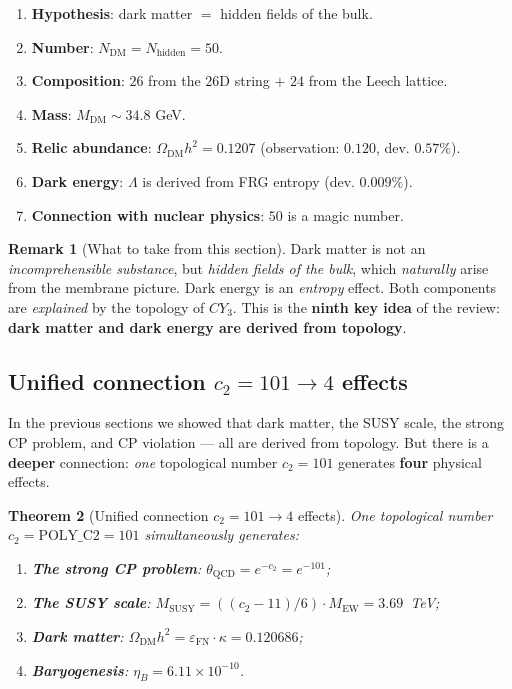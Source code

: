 \documentclass[11pt,a4paper]{article}
\newcommand{\CY}{CY_3}
\newcommand{\Nhidden}{N_{\text{hidden}}}
\newcommand{\epsFN}{\varepsilon_{\text{FN}}}
\newtheorem{theorem}{Theorem}[section]
\theoremstyle{definition}
\newtheorem{remark}[theorem]{Remark}
\begin{document}
\begin{enumerate}
    \item \textbf{Hypothesis}: dark matter $=$ hidden fields of the bulk.
    \item \textbf{Number}: $N_{\text{DM}} = \Nhidden = 50$.
    \item \textbf{Composition}: $26$ from the $26$D string $+$ $24$ from 
          the Leech lattice.
    \item \textbf{Mass}: $M_{\text{DM}} \sim 34.8$ GeV.
    \item \textbf{Relic abundance}: 
          $\Omega_{\text{DM}} h^2 = 0.1207$ (observation: $0.120$, 
          dev. $0.57\%$).
    \item \textbf{Dark energy}: $\Lambda$ is derived from 
          FRG entropy (dev. $0.009\%$).
    \item \textbf{Connection with nuclear physics}: $50$ is a magic 
          number.
\end{enumerate}

\begin{remark}[What to take from this section]
\label{rem:dm-takeaway}
Dark matter is not an \emph{incomprehensible substance}, but 
\emph{hidden fields of the bulk}, which \emph{naturally} 
arise from the membrane picture. Dark energy is an 
\emph{entropy} effect. Both components are \emph{explained} 
by the topology of $\CY$. This is the \textbf{ninth key idea} 
of the review: \textbf{dark matter and dark energy are derived 
from topology}.
\end{remark}

\subsection{Unified connection \texorpdfstring{$c_2 = 101 \to 4$}{c2 = 101 -> 4} effects}
\label{subsec:unified-c2-review}

In the previous sections we showed that dark matter, 
the SUSY scale, the strong CP problem, and CP violation — all 
are derived from topology. But there is a \textbf{deeper} 
connection: \emph{one} topological number $c_2 = 101$ generates 
\textbf{four} physical effects.

\begin{theorem}[Unified connection $c_2 = 101 \to 4$ effects]
\label{thm:unified-c2-review}
One topological number $c_2 = \text{POLY\_C2} = 101$ 
simultaneously generates:
\begin{enumerate}
    \item \textbf{The strong CP problem}: 
          $\theta_{\text{QCD}} = e^{-c_2} = e^{-101}$;
    \item \textbf{The SUSY scale}: 
          $M_{\text{SUSY}} = ((c_2-11)/6) \cdot M_{\text{EW}} = 3.69$~TeV;
    \item \textbf{Dark matter}: 
          $\Omega_{\text{DM}} h^2 = \epsFN \cdot \kappa = 0.120686$;
    \item \textbf{Baryogenesis}: 
          $\eta_B = 6.11 \times 10^{-10}$.
\end{enumerate}
\end{theorem}
\end{document}

